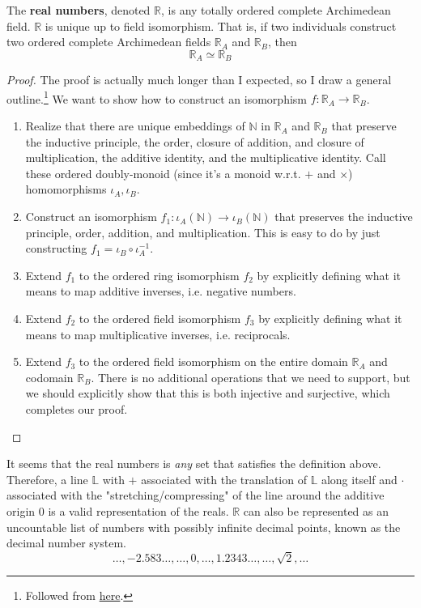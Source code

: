   \begin{theorem}
    The \textbf{real numbers}, denoted $\mathbb{R}$, is any totally ordered complete Archimedean field. $\mathbb{R}$ is unique up to field isomorphism. That is, if two individuals construct two ordered complete Archimedean fields $\mathbb{R}_A$ and $\mathbb{R}_B$, then 
    \begin{equation}
      \mathbb{R}_A \simeq \mathbb{R}_B
    \end{equation}
  \end{theorem} 
  \begin{proof}
    The proof is actually much longer than I expected, so I draw a general outline.\footnote{Followed from \href{https://math.ucr.edu/~res/math205A/uniqreals.pdf}{here}.} We want to show how to construct an isomorphism $f: \mathbb{R}_A \rightarrow \mathbb{R}_B$. 
    \begin{enumerate}
      \item Realize that there are unique embeddings of $\mathbb{N}$ in $\mathbb{R}_A$ and $\mathbb{R}_B$ that preserve the inductive principle, the order, closure of addition, and closure of multiplication, the additive identity, and the multiplicative identity. Call these ordered doubly-monoid (since it's a monoid w.r.t. $+$ and $\times$) homomorphisms $\iota_A, \iota_B$. 
      \item Construct an isomorphism $f_1: \iota_A(\mathbb{N}) \rightarrow \iota_B(\mathbb{N})$ that preserves the inductive principle, order, addition, and multiplication. This is easy to do by just constructing $f_1 = \iota_B \circ \iota_A^{-1}$. 
      \item Extend $f_1$ to the ordered ring isomorphism $f_2$ by explicitly defining what it means to map additive inverses, i.e. negative numbers. 
      \item Extend $f_2$ to the ordered field isomorphism $f_3$ by explicitly defining what it means to map multiplicative inverses, i.e. reciprocals. 
      \item Extend $f_3$ to the ordered field isomorphism on the entire domain $\mathbb{R}_A$ and codomain $\mathbb{R}_B$. There is no additional operations that we need to support, but we should explicitly show that this is both injective and surjective, which completes our proof. 
    \end{enumerate}
  \end{proof}

  It seems that the real numbers is \textit{any} set that satisfies the definition above. Therefore, a line $\mathbb{L}$ with $+$ associated with the translation of $\mathbb{L}$ along itself and $\cdot$ associated with the "stretching/compressing" of the line around the additive origin $0$ is a valid representation of the reals. $\mathbb{R}$ can also be represented as an uncountable list of numbers with possibly infinite decimal points, known as the decimal number system. 
  \begin{equation}
    \ldots, -2.583\ldots, \ldots , 0, \ldots, 1.2343\ldots, \ldots, \sqrt{2}, \ldots
  \end{equation}

